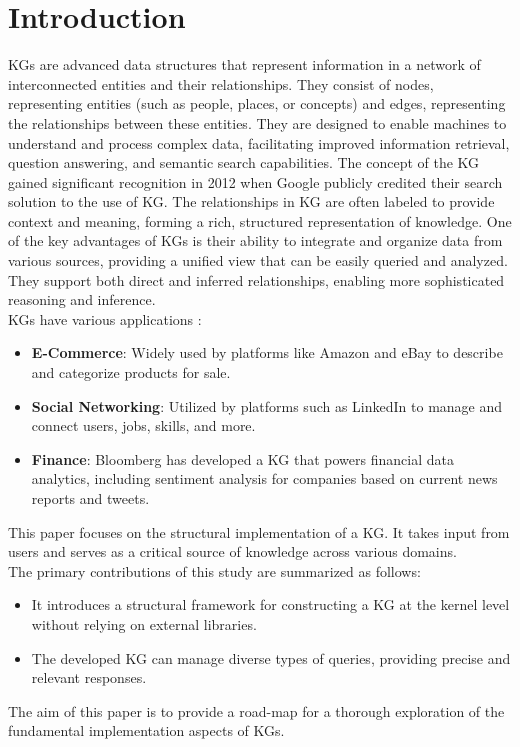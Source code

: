 \documentclass[conference]{IEEEtran}
\begin{document}
\section{Introduction}
KGs are advanced data structures that represent information in a network of interconnected entities and their relationships. They consist of nodes, representing entities (such as people, places, or concepts) and edges, representing the relationships between these entities. They are designed to enable machines to understand and process complex data, facilitating improved information retrieval, question answering, and semantic search capabilities.
The concept of the KG gained significant recognition in 2012 when Google \cite{b7} publicly credited their search solution to the use of KG.
The relationships in KG are often labeled to provide context and meaning, forming a rich, structured representation of knowledge.
One of the key advantages of KGs is their ability to integrate and organize data from various sources, providing a unified view that can be easily queried and analyzed. They support both direct and inferred relationships, enabling more sophisticated reasoning and inference.
\\KGs have various applications : 
\begin{itemize}
    \item \textbf{E-Commerce}: Widely used by platforms like Amazon\cite{b2, b3} and eBay\cite{b4} to describe and categorize products for sale.
    \item \textbf{Social Networking}: Utilized by platforms such as LinkedIn\cite{b5} to manage and connect users, jobs, skills, and more.
    \item \textbf{Finance}: Bloomberg\cite{b6} has developed a KG that powers financial data analytics, including sentiment analysis for companies based on current news reports and tweets.
\end{itemize}

This paper focuses on the structural implementation of a KG. It takes input from users and serves as a critical source of knowledge across various domains. 
\\
The primary contributions of this study are summarized as follows:

\begin{itemize}
    \item It introduces a structural framework for constructing a KG at the kernel level without relying on external libraries.
    \item The developed KG can manage diverse types of queries, providing precise and relevant responses.
\end{itemize}
The aim of this paper is to provide a road-map for a thorough exploration of the fundamental implementation aspects of KGs.
\end{document}
